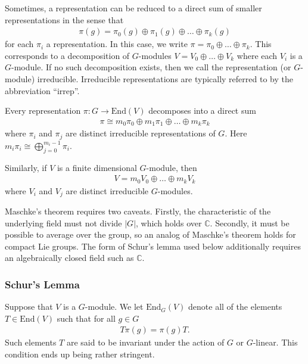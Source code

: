 Sometimes, a representation can be reduced to a direct sum of smaller representations in the sense that 
\begin{align}
    \pi(g) = \pi_0(g) \oplus \pi_1(g) \oplus \dots \oplus \pi_k(g)
\end{align}
for each $\pi_i$ a representation.
In this case, we write $\pi = \pi_0 \oplus \dots \oplus \pi_k$.
This corresponds to a decomposition of $G$-modules $V = V_0 \oplus \dots \oplus V_k$ where each $V_i$ is a $G$-module.
If no such decomposition exists, then we call the representation (or $G$-module) irreducible.
Irreducible representations are typically referred to by the abbreviation ``irrep''.

\begin{theorem} \label{thm:maschkes-theorem}
    Every representation $\pi : G \to \mathrm{End}(V)$ decomposes into a direct sum
    \begin{align}
        \pi \cong m_0 \pi_0 \oplus m_1 \pi_1 \oplus \dots \oplus m_k \pi_k
    \end{align}
    where $\pi_i$ and $\pi_j$ are distinct irreducible representations of $G$. Here $m_i \pi_i \cong \bigoplus_{j=0}^{m_i - 1} \pi_i$.

    Similarly, if $V$ is a finite dimensional $G$-module, then 
    \begin{align}
        V = m_0 V_0 \oplus \dots \oplus m_k V_k
    \end{align}
    where $V_i$ and $V_j$ are distinct irreducible $G$-modules.
\end{theorem}
Maschke's theorem requires two caveats.
Firstly, the characteristic of the underlying field must not divide $|G|$, which holds over $\mathbb{C}$.
Secondly, it must be possible to average over the group, so an analog of Maschke's theorem holds for compact Lie groups.
The form of Schur's lemma used below additionally requires an algebraically closed field such as $\mathbb{C}$.

\subsubsection{Schur's Lemma}

Suppose that $V$ is a $G$-module. 
We let $\mathrm{End}_G(V)$ denote all of the elements $T \in \mathrm{End}(V)$ such that for all $g \in G$
\begin{align}
    T \pi(g) = \pi(g)T.
\end{align}
Such elements $T$ are said to be invariant under the action of $G$ or $G$-linear.
This condition ends up being rather stringent.

